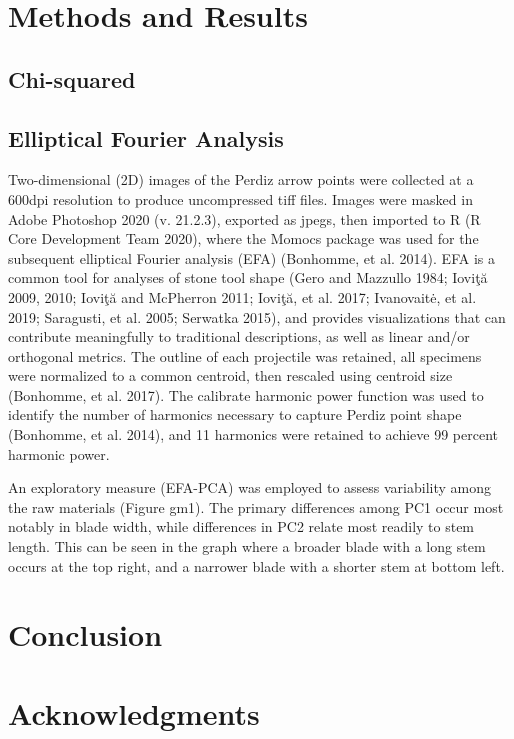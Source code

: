 \documentclass[review]{elsarticle}
\begin{document}
\section*{Methods and Results}

\subsection*{Chi-squared}

\subsection*{Elliptical Fourier Analysis}

Two-dimensional (2D) images of the Perdiz arrow points were collected at a 600dpi resolution to produce uncompressed tiff files. Images were masked in Adobe Photoshop 2020 (v. 21.2.3), exported as jpegs, then imported to R (R Core Development Team 2020), where the Momocs package was used for the subsequent elliptical Fourier analysis (EFA) (Bonhomme, et al. 2014). EFA is a common tool for analyses of stone tool shape (Gero and Mazzullo 1984; Ioviţă 2009, 2010; Ioviţă and McPherron 2011; Ioviţă, et al. 2017; Ivanovaitė, et al. 2019; Saragusti, et al. 2005; Serwatka 2015), and provides visualizations that can contribute meaningfully to traditional descriptions, as well as linear and/or orthogonal metrics. The outline of each projectile was retained, all specimens were normalized to a common centroid, then rescaled using centroid size (Bonhomme, et al. 2017). The calibrate harmonic power function was used to identify the number of harmonics necessary to capture Perdiz point shape (Bonhomme, et al. 2014), and 11 harmonics were retained to achieve 99 percent harmonic power.

An exploratory measure (EFA-PCA) was employed to assess variability among the raw materials (Figure gm1). The primary differences among PC1 occur most notably in blade width, while differences in PC2 relate most readily to stem length. This can be seen in the graph where a broader blade with a long stem occurs at the top right, and a narrower blade with a shorter stem at bottom left.

\section*{Conclusion}



\section*{Acknowledgments}
\end{document}
